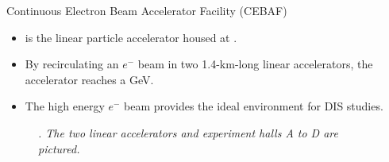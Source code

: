 \begin{frame}{Continuous Electron Beam Accelerator Facility (CEBAF)}
    \label{10.31::cebaf}

    \begin{itemize}
        \item
             is the linear particle accelerator housed at .

        \item
            By recirculating an $e^-$ beam in two 1.4-km-long linear accelerators, the accelerator reaches a  \textcolor{efd_green}{GeV}.

        \item
            The high energy $e^-$ beam provides the ideal environment for DIS studies.
    \end{itemize}

    \begin{center}
        \begin{figure}[t]

            \scriptsize{\textit{
                .
                The two linear accelerators and experiment halls A to D are pictured.
            }}
        \end{figure}
    \end{center}
\end{frame}

